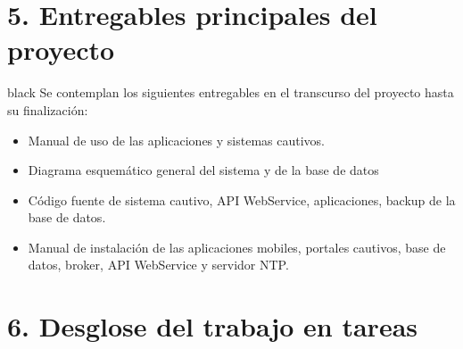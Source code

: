 \documentclass[11pt]{charter}
\begin{document}
\newpage
{}
\recalctypearea
\vspace*{1px}


\section{5. Entregables principales del proyecto}
\label{sec:entregables}

\begin{consigna}{black}
Se contemplan los siguientes entregables en el transcurso del proyecto hasta su finalización: 
	\begin{itemize}
		\item Manual de uso de las aplicaciones y sistemas cautivos.
		\item Diagrama esquemático general del sistema y de la base de datos
		\item Código fuente de sistema cautivo, API WebService, aplicaciones, backup de la  base de datos.
		\item Manual de instalación de las aplicaciones mobiles, portales cautivos, base de datos, broker, API WebService y servidor NTP.
	\end{itemize}
\end{consigna}

\section{6. Desglose del trabajo en tareas}
\label{sec:wbs}
\end{document}
